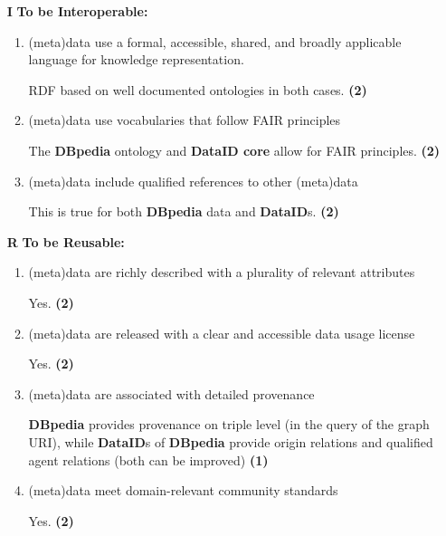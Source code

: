 \documentclass[a4paper,english,twoside,BCOR1.5cm,headsepline,DIV12,appendixprefix,final,12pt]{scrbook}
\newcommand{\dataid}{{\ttfamily\bfseries DataID}\xspace}
\newcommand{\core}{{\ttfamily\bfseries DataID core}\xspace}
\newcommand{\dbpedia}{{\ttfamily\bfseries DBpedia}\xspace}
\begin{document}
\begin{enumerate}
\begin{enumerate}[1]
\item metadata are accessible, even when the data are no longer available
\begin{flushright}
\dataid documents will remain available \textbf{\color{ForestGreen}(2)}
\end{flushright}
\end{enumerate}
\item[\textbf{I}] \textbf{To be Interoperable:}
\begin{enumerate}[1]
\item (meta)data use a formal, accessible, shared, and broadly applicable language for knowledge representation.
\begin{flushright} RDF based on well documented ontologies in both cases. \textbf{\color{ForestGreen}(2)}\end{flushright}
\item (meta)data use vocabularies that follow FAIR principles
\begin{flushright} The \dbpedia ontology and \core allow for FAIR principles. \textbf{\color{ForestGreen}(2)}\end{flushright}
\item (meta)data include qualified references to other (meta)data
\begin{flushright} This is true for both \dbpedia data and \dataid{}s. \textbf{\color{ForestGreen}(2)}\end{flushright}
\end{enumerate}
\item[\textbf{R}] \textbf{To be Reusable:}
\begin{enumerate}[1]
\item (meta)data are richly described with a plurality of relevant attributes
\begin{flushright} Yes. \textbf{\color{ForestGreen}(2)}\end{flushright}
\item (meta)data are released with a clear and accessible data usage license
\begin{flushright} Yes. \textbf{\color{ForestGreen}(2)}\end{flushright}
\item (meta)data are associated with detailed provenance
\begin{flushright} \dbpedia provides provenance on triple level (in the query of the graph URI), while \dataid{}s of \dbpedia provide origin relations and qualified agent relations (both can be improved) \textbf{\color{BurntOrange}(1)}\end{flushright}
\item (meta)data meet domain-relevant community standards
\begin{flushright} Yes. \textbf{\color{ForestGreen}(2)}\end{flushright}
\end{enumerate}
\end{enumerate}
\end{document}
